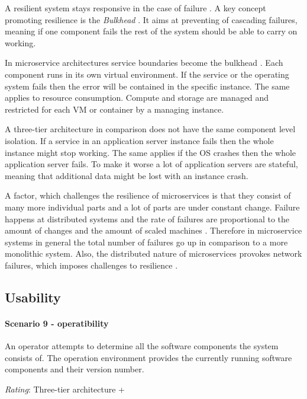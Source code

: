 A resilient system stays responsive in the case of failure  \citep{Reactive2014}.
A key concept promoting resilience is the \textit{Bulkhead} \citep[p. 5]{Newman2015}. 
It aims at preventing of cascading failures, meaning if one component fails the rest of the system should be able to carry on working.

In microservice architectures service boundaries become the bulkhead \citep[p. 5]{Newman2015}. 
Each component runs in its own virtual environment.
If the service or the operating system fails then the error will be contained in the specific instance.
The same applies to resource consumption.
Compute and storage are managed and restricted for each \ac{VM} or container by a managing instance.

A three-tier architecture in comparison does not have the same component level isolation.
If a service in an application server instance fails then the whole instance might stop working.
The same applies if the \ac{OS} crashes then the whole application server fails.
To make it worse a lot of application servers are stateful, meaning that additional data might be lost with an instance crash.

A factor, which challenges the resilience of microservices is that they consist of many more individual parts and a lot of parts are under constant change.
Failure happens at distributed systems and the rate of failures are proportional to the amount of changes and the amount of scaled machines \citep[29:30]{NetflixMSAtScale2016}.
Therefore in microservice systems in general the total number of failures go up in comparison to a more monolithic system\citep[p. 66]{Wolff2016}.
Also, the distributed nature of microservices provokes network failures, which imposes challenges to resilience \citep[p. 5]{Newman2015}.

\subsection{Usability}
\label{quaMicro:usability}
\paragraph{Scenario 9 - operatibility}
An operator attempts to determine all the software components the system consists of. The operation environment provides the currently running software components and their version number.
\label{quaMicro:s9}

\textit{Rating}: Three-tier architecture +

